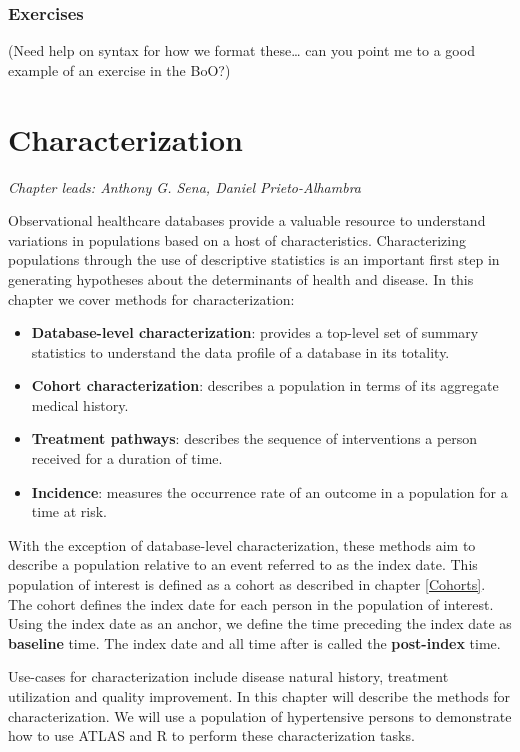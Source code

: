 \documentclass[11pt]{book}
\providecommand{\tightlist}{%
  \setlength{\itemsep}{0pt}\setlength{\parskip}{0pt}}
\theoremstyle{definition}
\theoremstyle{definition}
\theoremstyle{definition}
\theoremstyle{remark}
\begin{document}
\hypertarget{exercises-2}{%
\subsection{Exercises}\label{exercises-2}}

(Need help on syntax for how we format these\ldots{} can you point me to a good example of an exercise in the BoO?)

\hypertarget{Characterization}{%
\chapter{Characterization}\label{Characterization}}

\emph{Chapter leads: Anthony G. Sena, Daniel Prieto-Alhambra}

Observational healthcare databases provide a valuable resource to understand variations in populations based on a host of characteristics. Characterizing populations through the use of descriptive statistics is an important first step in generating hypotheses about the determinants of health and disease. In this chapter we cover methods for characterization:

\begin{itemize}
\tightlist
\item
  \textbf{Database-level characterization}: provides a top-level set of summary statistics to understand the data profile of a database in its totality.
\item
  \textbf{Cohort characterization}: describes a population in terms of its aggregate medical history.
\item
  \textbf{Treatment pathways}: describes the sequence of interventions a person received for a duration of time.
\item
  \textbf{Incidence}: measures the occurrence rate of an outcome in a population for a time at risk.
\end{itemize}

With the exception of database-level characterization, these methods aim to describe a population relative to an event referred to as the index date. This population of interest is defined as a cohort as described in chapter \ref{Cohorts}. The cohort defines the index date for each person in the population of interest. Using the index date as an anchor, we define the time preceding the index date as \textbf{baseline} time. The index date and all time after is called the \textbf{post-index} time.

Use-cases for characterization include disease natural history, treatment utilization and quality improvement. In this chapter will describe the methods for characterization. We will use a population of hypertensive persons to demonstrate how to use ATLAS and R to perform these characterization tasks.
\end{document}
